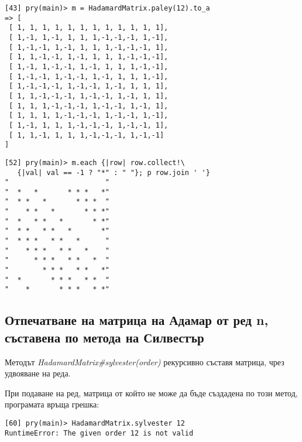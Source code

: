 \documentclass[a4paper,notitlepage,oneside]{report}
\begin{document}
\begin{multicols}{2}

\begin{lstlisting}
[43] pry(main)> m = HadamardMatrix.paley(12).to_a
=> [
 [ 1, 1, 1, 1, 1, 1, 1, 1, 1, 1, 1, 1],
 [ 1,-1, 1,-1, 1, 1, 1,-1,-1,-1, 1,-1],
 [ 1,-1,-1, 1,-1, 1, 1, 1,-1,-1,-1, 1],
 [ 1, 1,-1,-1, 1,-1, 1, 1, 1,-1,-1,-1],
 [ 1,-1, 1,-1,-1, 1,-1, 1, 1, 1,-1,-1],
 [ 1,-1,-1, 1,-1,-1, 1,-1, 1, 1, 1,-1],
 [ 1,-1,-1,-1, 1,-1,-1, 1,-1, 1, 1, 1],
 [ 1, 1,-1,-1,-1, 1,-1,-1, 1,-1, 1, 1],
 [ 1, 1, 1,-1,-1,-1, 1,-1,-1, 1,-1, 1],
 [ 1, 1, 1, 1,-1,-1,-1, 1,-1,-1, 1,-1],
 [ 1,-1, 1, 1, 1,-1,-1,-1, 1,-1,-1, 1],
 [ 1, 1,-1, 1, 1, 1,-1,-1,-1, 1,-1,-1]
]
\end{lstlisting}

\begin{lstlisting}
[52] pry(main)> m.each {|row| row.collect!\
   {|val| val == -1 ? "*" : " "}; p row.join ' '}
"                       "
"  *   *       * * *   *"
"  * *   *       * * *  "
"    * *   *       * * *"
"  *   * *   *       * *"
"  * *   * *   *       *"
"  * * *   * *   *      "
"    * * *   * *   *    "
"      * * *   * *   *  "
"        * * *   * *   *"
"  *       * * *   * *  "
"    *       * * *   * *"

\end{lstlisting}

\end{multicols}

\subsection{Отпечатване на матрица на Адамар от ред n, съставена по метода на
  Силвестър}
Методът \emph{HadamardMatrix\#sylvester(order)} рекурсивно съставя матрица, чрез
удвояване на реда.

При подаване на ред, матрица от който не може да бъде създадена по този метод,
програмата връща грешка:
\begin{lstlisting}
[60] pry(main)> HadamardMatrix.sylvester 12
RuntimeError: The given order 12 is not valid
\end{lstlisting}
\end{document}
